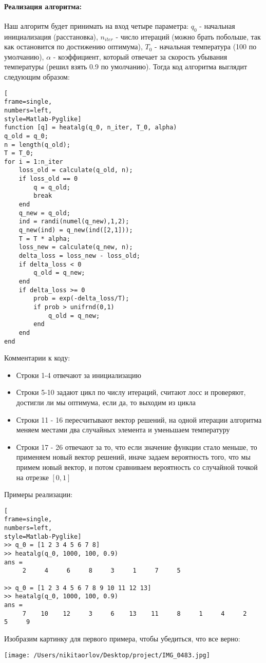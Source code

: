 \documentclass[12pt]{article}
\begin{document}
\paragraph{Реализация алгоритма:}
Наш алгоритм будет принимать на вход четыре параметра: $q_0$ - начальная инициализация (расстановка), $n_{iter}$ - число итераций (можно брать побольше, так как остановится по достижению оптимума), $T_0$ - начальная температура (100 по умолчанию), $\alpha$ - коэффициент, который отвечает за скорость убывания температуры (решил взять 0.9 по умолчанию). Тогда код алгоритма выглядит следующим образом:
\begin{lstlisting}[
frame=single,
numbers=left,
style=Matlab-Pyglike]
function [q] = heatalg(q_0, n_iter, T_0, alpha)
q_old = q_0;
n = length(q_old);
T = T_0;
for i = 1:n_iter
    loss_old = calculate(q_old, n);
    if loss_old == 0
        q = q_old;
        break
    end
    q_new = q_old;
    ind = randi(numel(q_new),1,2);
    q_new(ind) = q_new(ind([2,1]));
    T = T * alpha;
    loss_new = calculate(q_new, n);
    delta_loss = loss_new - loss_old;
    if delta_loss < 0
        q_old = q_new;
    end
    if delta_loss >= 0
        prob = exp(-delta_loss/T);
        if prob > unifrnd(0,1)
            q_old = q_new;
        end
    end
end
\end{lstlisting}
Комментарии к коду: 
\begin{itemize}
	\item Строки 1-4 отвечают за инициализацию 
	\item Строки 5-10 задают цикл по числу итераций, считают лосс и проверяют, достигли ли мы оптимума, если да, то выходим из цикла
	\item Строки 11 - 16 пересчитывают вектор решений, на одной итерации алгоритма меняем местами два случайных элемента и уменьшаем температуру
	\item Строки 17 - 26 отвечают за то, что если значение функции стало меньше, то применяем новый вектор решений, иначе задаем вероятность того, что мы примем новый вектор, и потом сравниваем вероятность со случайной точкой на отрезке $[0,1]$
\end{itemize}
Примеры реализации:
\begin{lstlisting}[
frame=single,
numbers=left,
style=Matlab-Pyglike]
>> q_0 = [1 2 3 4 5 6 7 8]
>> heatalg(q_0, 1000, 100, 0.9)
ans =
     2     4     6     8     3     1     7     5

>> q_0 = [1 2 3 4 5 6 7 8 9 10 11 12 13]
>> heatalg(q_0, 1000, 100, 0.9)
ans =
     7    10    12     3     6    13    11     8     1     4     2     5     9
\end{lstlisting}
Изобразим картинку для первого примера, чтобы убедиться, что все верно:\\
\begin{center}
  		\texttt{[image: /Users/nikitaorlov/Desktop/project/IMG\_0483.jpg]}
\end{center}
\end{document}
